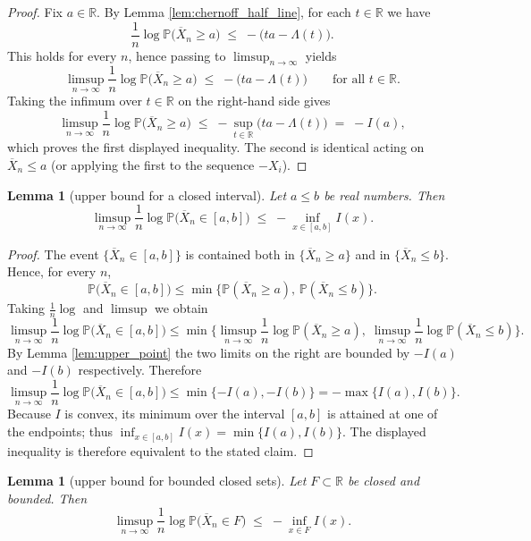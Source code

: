 \documentclass[12pt]{article}
\newtheorem{lemma}[theorem]{Lemma}
\theoremstyle{definition}
\theoremstyle{remark}
\begin{document}
\begin{proof}
Fix $a\in\mathbb R$.  By Lemma \ref{lem:chernoff_half_line}, for each $t\in\mathbb R$
we have
\[
\frac{1}{n}\log \mathbb{P}\big(\overline X_n \ge a\big)
\;\le\; -\big( t a - \Lambda(t) \big).
\]
This holds for every $n$, hence passing to $\limsup_{n\to\infty}$ yields
\[
\limsup_{n\to\infty}\frac{1}{n}\log \mathbb{P}\big(\overline X_n \ge a\big)
\;\le\; -\big( t a - \Lambda(t) \big)\qquad\text{for all }t\in\mathbb R.
\]
Taking the infimum over $t\in\mathbb R$ on the right-hand side gives
\[
\limsup_{n\to\infty}\frac{1}{n}\log \mathbb{P}\big(\overline X_n \ge a\big)
\;\le\; -\sup_{t\in\mathbb R}\big( t a - \Lambda(t)\big)
\;=\; -I(a),
\]
which proves the first displayed inequality.  The second is identical acting on
$\overline X_n \le a$ (or applying the first to the sequence $-X_i$).
\end{proof}

\begin{lemma}[upper bound for a closed interval]\label{lem:upper_interval}
Let $a\le b$ be real numbers.  Then
\[
\limsup_{n\to\infty}\frac{1}{n}\log \mathbb{P}\big( \overline X_n \in [a,b] \big)
\;\le\; -\inf_{x\in[a,b]} I(x).
\]
\end{lemma}

\begin{proof}
The event $\{\overline X_n\in[a,b]\}$ is contained both in $\{\overline X_n \ge a\}$
and in $\{\overline X_n \le b\}$. Hence, for every $n$,
\[
\mathbb{P}\big(\overline X_n \in [a,b]\big)
\le \min\big\{ \mathbb{P}(\overline X_n \ge a),\, \mathbb{P}(\overline X_n \le b)\big\}.
\]
Taking $\frac{1}{n}\log$ and $\limsup$ we obtain
\[
\limsup_{n\to\infty}\frac{1}{n}\log \mathbb{P}\big(\overline X_n \in [a,b]\big)
\le \min\Big\{ \limsup_{n\to\infty}\frac{1}{n}\log \mathbb{P}(\overline X_n \ge a),\;
\limsup_{n\to\infty}\frac{1}{n}\log \mathbb{P}(\overline X_n \le b)\Big\}.
\]
By Lemma \ref{lem:upper_point} the two limits on the right are bounded by $-I(a)$
and $-I(b)$ respectively. Therefore
\[
\limsup_{n\to\infty}\frac{1}{n}\log \mathbb{P}\big(\overline X_n \in [a,b]\big)
\le \min\{ -I(a), -I(b)\} = -\max\{ I(a), I(b)\}.
\]
Because $I$ is convex, its minimum over the interval $[a,b]$ is attained at one of the
endpoints; thus $\inf_{x\in[a,b]} I(x) = \min\{I(a),I(b)\}$. The displayed inequality
is therefore equivalent to the stated claim.
\end{proof}

\begin{lemma}[upper bound for bounded closed sets]\label{lem:upper_bounded_closed}
Let $F\subset\mathbb R$ be closed and bounded.  Then
\[
\limsup_{n\to\infty}\frac{1}{n}\log \mathbb{P}\big( \overline X_n \in F \big)
\;\le\; -\inf_{x\in F} I(x).
\]
\end{lemma}
\end{document}
